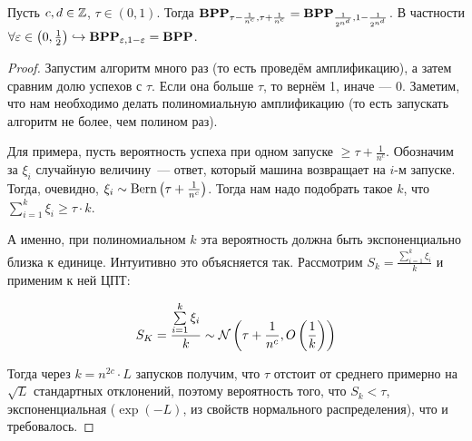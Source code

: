 \begin{theorem} Пусть $c, d \in \mathbb{Z}$, $\tau \in (0, 1)$. Тогда $\textbf{BPP}_{\tau - \frac{1}{n^c}, \tau + \frac{1}{n^c}} = \textbf{BPP}_{\frac{1}{2^{n^d}}, 1 - \frac{1}{2^{n^d}}}$. В частности $\forall \varepsilon \in \left({0, \frac{1}{2}}\right) \hookrightarrow \textbf{BPP}_{\varepsilon, 1 - \varepsilon} = \textbf{BPP}$.
\end{theorem}

\begin{proof} Запустим алгоритм много раз (то есть проведём амплификацию), а затем сравним долю успехов с $\tau$. Если она больше $\tau$, то вернём 1, иначе — 0. Заметим, что нам необходимо делать полиномиальную амплификацию (то есть запускать алгоритм не более, чем полином раз).

Для примера, пусть вероятность успеха при одном запуске $\geq \tau + \frac{1}{n^c}$. Обозначим за $\xi_i$ случайную величину~--- ответ, который машина возвращает на $i$-м запуске. Тогда, очевидно, $\xi_i \sim \text{Bern}\left({\tau + \frac{1}{n^c}}\right)$. Тогда нам надо подобрать такое $k$, что $\sum\limits_{i = 1}^k \xi_i \geq \tau \cdot k$.

А именно, при полиномиальном $k$ эта вероятность должна быть экспоненциально близка к единице. Интуитивно это объясняется так. Рассмотрим $S_k = \frac{\sum\limits_{i = 1}^k \xi_i}{k}$ и применим к ней ЦПТ:

$$
S_K = \frac{\sum\limits_{i = 1}^k \xi_i}{k} \sim \mathcal{N}\left({\tau + \frac{1}{n^c}, O\left({\frac{1}{k}}\right)}\right)
$$

Тогда через $k = n^{2c} \cdot L$ запусков получим, что $\tau$ отстоит от среднего примерно на $\sqrt{L}$ стандартных отклонений, поэтому вероятность того, что $S_k < \tau$, экспоненциальная ($\exp(-L)$, из свойств нормального распределения), что и требовалось.
\end{proof}